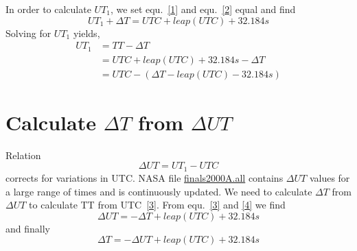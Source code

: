 \documentclass[]{article}
\begin{document}
In order to calculate $UT_{1}$, we set equ.~\ref{1} and equ.~\ref{2} equal and find
\begin{equation}
UT_{1} + \Delta T = UTC + leap(UTC) + 32.184s
\end{equation}
Solving for $UT_{1}$ yields,
\begin{align}
\label{3}
UT_{1} &= TT - \Delta T \\
       &= UTC + leap(UTC) + 32.184s - \Delta T \\
       &= UTC - \left( \Delta T - leap(UTC) - 32.184s \right)
\end{align}

\section{Calculate $\Delta T$ from $\Delta UT$}

Relation
\begin{equation}
\label{4}
\Delta UT = UT_{1} - UTC
\end{equation}
corrects for variations in UTC.
NASA file \href{https://cddis.nasa.gov/archive/products/iers/finals2000A.all}{finals2000A.all} contains
$\Delta UT$ values for a large range of times and is continuously updated.
We need to calculate $\Delta T$ from $\Delta UT$ to calculate TT from UTC~\ref{3}.
From equ.~\ref{3} and \ref{4} we find
\begin{equation}
\label{5}
\Delta UT = -\Delta T + leap(UTC) + 32.184s
\end{equation}
and finally
\begin{equation}
\label{6}
\Delta T = -\Delta UT + leap(UTC) + 32.184s
\end{equation}
\end{document}
